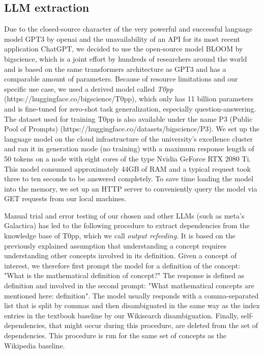 \documentclass{article}
\begin{document}
\subsection{LLM extraction}
Due to the closed-source character of the very powerful and successful language model GPT3 by openai and the unavailability of an API for its most recent application ChatGPT, we decided to use the open-source model BLOOM by bigscience, which is a joint effort by hundreds of researchers around the world and is based on the same transformers architecture as GPT3 and has a comparable amount of parameters. Because of resource limitations and our specific use case, we used a derived model called \textit{T0pp} (https://huggingface.co/bigscience/T0pp), which only has 11 billion parameters and is fine-tuned for zero-shot task generalization, especially question-answering. The dataset used for training T0pp is also available under the name P3 (Public Pool of Prompts) (https://huggingface.co/datasets/bigscience/P3). We set up the language model on the cloud infrastructure of the university's excellence cluster and ran it in generation mode (no training) with a maximum response length of 50 tokens on a node with eight cores of the type Nvidia GeForce RTX 2080 Ti. This model consumed approximately 44GB of RAM and a typical request took three to ten seconds to be answered completely. To save time loading the model into the memory, we set up an HTTP server to conveniently query the model via GET requests from our local machines.

Manual trial and error testing of our chosen and other LLMs (such as meta's Galactica) has led to the following procedure to extract dependencies from the knowledge base of T0pp, which we call \textit{output refeeding}. It is based on the previously explained assumption that understanding a concept requires understanding other concepts involved in its definition. Given a concept of interest, we therefore first prompt the model for a definition of the concept: "What is the mathematical definition of {concept}?" The response is defined as {definition} and involved in the second prompt: "What mathematical concepts are mentioned here: {definition}". The model usually responds with a comma-separated list that is split by commas and then disambiguated in the same way as the index entries in the textbook baseline by our Wikisearch disambiguation. Finally, self-dependencies, that might occur during this procedure, are deleted from the set of dependencies. This procedure is run for the same set of concepts as the Wikipedia baseline.
\end{document}
